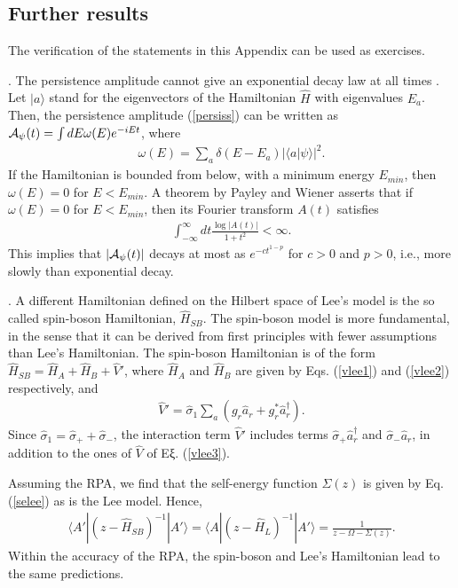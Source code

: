 \documentclass[12pt]{article}
\numberwithin{equation}{section}
\begin{document}
\begin{appendix}
\section{Further results}
The verification of the statements in this Appendix can be used as exercises.

\bigskip

. The persistence amplitude cannot give an exponential decay law at all times \cite{Khalfin}. Let $|a\rangle$ stand for the eigenvectors of the Hamiltonian $\hat{H}$ with eigenvalues $E_a$. Then, the persistence amplitude (\ref{persiss}) can be written as ${\cal A}_{\psi}(t) = \int dE \omega(E)e^{-iEt}$, where
\begin{eqnarray}
\omega(E) = \sum_a \delta(E-E_a) |\langle a|\psi\rangle|^2.
\end{eqnarray}
If the Hamiltonian is bounded from below, with a minimum energy $E_{min}$, then $\omega(E) = 0 $ for $E < E_{min}$. A theorem by Payley and Wiener  \cite{PaWi} asserts that if $\omega(E) = 0 $ for $E < E_{min}$, then its
Fourier transform $A(t)$  satisfies
\begin{eqnarray}
\int_{-\infty}^{\infty} dt \frac{ \log|A(t)|}{1+t^2} < \infty.
\end{eqnarray}
 This implies that $|{\cal A}_{\psi}(t)|$ decays at most  as $e^{-c t^{1 - p}}$ for $c > 0$ and $p >0$, i.e., more slowly than exponential decay.

 \bigskip

.
 A different Hamiltonian defined on the  Hilbert space of Lee's model is the so called spin-boson Hamiltonian, $\hat{H}_{SB}$. The spin-boson model \cite{spbo} is more fundamental, in the sense that it can be derived from first principles with fewer assumptions than Lee's Hamiltonian. The spin-boson Hamiltonian is of the form
  $\hat{H}_{SB} = \hat{H}_A + \hat{H}_B + \hat{V}'$, where $\hat{H}_A$ and $\hat{H}_B$ are given by Eqs. (\ref{vlee1}) and (\ref{vlee2}) respectively, and
\begin{eqnarray}
\hat{V}' =  \hat{\sigma}_1  \sum_a \left(g_r     \hat{a}_r + g_r^*   \hat{a}_r^{\dagger} \right). \label{vsb}
\end{eqnarray}
Since $\hat{\sigma}_1 = \hat{\sigma}_+ + \hat{\sigma}_-$, the interaction term $\hat{V}'$ includes terms  $\hat{\sigma}_+  \hat{a}^{\dagger}_r$ and $\hat{\sigma}_-   \hat{a}_r$, in addition to the ones of  $\hat{V}$  of Εξ. (\ref{vlee3}).

Assuming the RPA, we find that the self-energy function  $\Sigma(z)$ is given by Eq. (\ref{selee}) as is the Lee model. Hence,
\begin{eqnarray}
\langle A' |(z -\hat{H}_{SB})^{-1}|A'\rangle  = \langle A |(z -\hat{H}_L)^{-1}|A'\rangle =   \frac{1}{z - \Omega - \Sigma(z)}.
\end{eqnarray}
 Within the accuracy of the RPA, the spin-boson and Lee's Hamiltonian lead to the same predictions.


\end{appendix}
\end{document}
